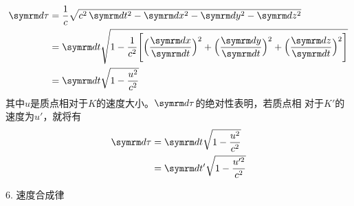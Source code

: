 ~\vspace{-1.56em}
{\setlength{\mathindent}{4em}
  \begin{equation}\label{eqn:11.05.07}
    \begin{aligned}
      \dif \tau & =\frac{1}{c} \sqrt{c^{2} \dif t^{2}- \dif x^{2}- \dif y^{2}- \dif z^{2}}                                                                                       \\
                & = \dif t \sqrt{1-\frac{1}{c^{2}}\Bigg[\Big(\frac{ \dif x}{ \dif t}\Big)^{2}+\Big(\frac{ \dif y}{ \dif t}\Big)^{2}+\Big(\frac{ \dif z}{ \dif t}\Big)^{2}\Bigg]} \\
                & = \dif t \sqrt{1-\frac{u^{2}}{c^{2}}}
    \end{aligned}
  \end{equation}}
其中$ u $是质点相对于$ K $的速度大小。$ \dif \tau $的绝对性表明，若质点相
对于$ K ' $的速度为$ u ' $，就将有
\begin{equation*}
  \begin{aligned}
    \dif \tau & = \dif t \sqrt{1-\frac{u^{2}}{c^{2}}}                 \\
              & = \dif t^{\prime} \sqrt{1-\frac{u^{\prime 2}}{c^{2}}}
  \end{aligned}
\end{equation*}

\textsf{6. 速度合成律}


